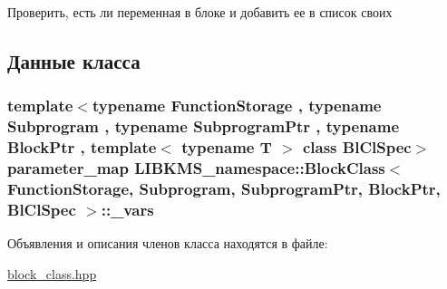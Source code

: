 Проверить, есть ли переменная в блоке и добавить ее в список своих 



\subsection{Данные класса}
\hypertarget{classLIBKMS__namespace_1_1BlockClass_a67c59fc343b2a7b7b54ab36c55f38484}{
\subsubsection[{\-\_\-vars}]{\setlength{\rightskip}{0pt plus 5cm}template$<$typename Function\-Storage , typename Subprogram , typename Subprogram\-Ptr , typename Block\-Ptr , template$<$ typename T $>$ class Bl\-Cl\-Spec$>$ {\bf parameter\-\_\-map} {\bf L\-I\-B\-K\-M\-S\-\_\-namespace\-::\-Block\-Class}$<$ {\bf Function\-Storage}, {\bf Subprogram}, Subprogram\-Ptr, Block\-Ptr, Bl\-Cl\-Spec $>$\-::\-\_\-vars\hspace{0.3cm}{\ttfamily [protected]}}}\label{classLIBKMS__namespace_1_1BlockClass_a67c59fc343b2a7b7b54ab36c55f38484}


Объявления и описания членов класса находятся в файле\-:\begin{DoxyCompactItemize}
\item 
\hyperlink{block__class_8hpp}{block\-\_\-class.\-hpp}\end{DoxyCompactItemize}
